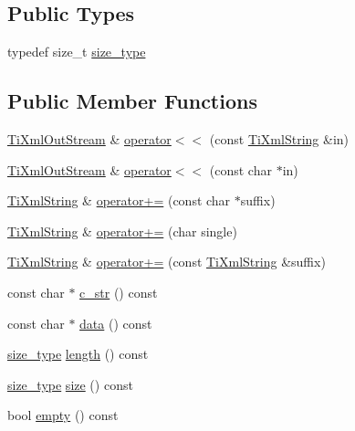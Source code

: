 \subsection*{Public Types}
\begin{DoxyCompactItemize}
\item 
typedef size\_\-t \hyperlink{classTiXmlString_abeb2c1893a04c17904f7c06546d0b971}{size\_\-type}
\end{DoxyCompactItemize}
\subsection*{Public Member Functions}
\begin{DoxyCompactItemize}
\item 
\hyperlink{classTiXmlOutStream}{TiXmlOutStream} \& \hyperlink{classTiXmlOutStream_a3640dcb1c0903be3bc6966cdc9a79db6}{operator$<$$<$} (const \hyperlink{classTiXmlString}{TiXmlString} \&in)
\item 
\hyperlink{classTiXmlOutStream}{TiXmlOutStream} \& \hyperlink{classTiXmlOutStream_af2117e5a8cbfcb69544804ad2859bfb6}{operator$<$$<$} (const char $\ast$in)
\item 
\hyperlink{classTiXmlString}{TiXmlString} \& \hyperlink{classTiXmlString_ab56336ac2aa2a08d24a71eb9a2b502a5}{operator+=} (const char $\ast$suffix)
\item 
\hyperlink{classTiXmlString}{TiXmlString} \& \hyperlink{classTiXmlString_a6aa09d5240470b76d54ec709e04f8c13}{operator+=} (char single)
\item 
\hyperlink{classTiXmlString}{TiXmlString} \& \hyperlink{classTiXmlString_afdcae5ea2b4d9e194dc21226b817f417}{operator+=} (const \hyperlink{classTiXmlString}{TiXmlString} \&suffix)
\item 
const char $\ast$ \hyperlink{classTiXmlString_a5581ca641d915551d3cda90f8e7bf49b}{c\_\-str} () const 
\item 
const char $\ast$ \hyperlink{classTiXmlString_a00abc60f135c7ca1951c7334cc2c7993}{data} () const 
\item 
\hyperlink{classTiXmlString_abeb2c1893a04c17904f7c06546d0b971}{size\_\-type} \hyperlink{classTiXmlString_a3202f27d139a3fac79205f1f3c707727}{length} () const 
\item 
\hyperlink{classTiXmlString_abeb2c1893a04c17904f7c06546d0b971}{size\_\-type} \hyperlink{classTiXmlString_a96103e5c0f67e987fa48527e1f47a1f6}{size} () const 
\item 
bool \hyperlink{classTiXmlString_a9a61e1d11cdb71bea4a4ed79caa793f4}{empty} () const 
\item 

\end{DoxyCompactItemize}

